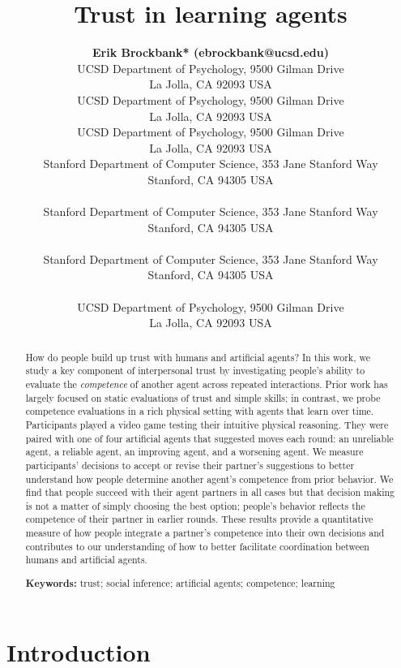 \documentclass[10pt,letterpaper]{article}
\title{Trust in learning agents}
\author{
  {
  \large \bf Erik Brockbank* (ebrockbank@ucsd.edu)} \\
  UCSD Department of Psychology, 9500 Gilman Drive \\
  La Jolla, CA 92093 USA
  \AND {\large \bf Haoliang Wang* (haw027@ucsd.edu)} \\
  UCSD Department of Psychology, 9500 Gilman Drive \\
  La Jolla, CA 92093 USA
  \AND {\large \bf Justin Yang (juy003@ucsd.edu)} \\
  UCSD Department of Psychology, 9500 Gilman Drive \\
  La Jolla, CA 92093 USA
  \AND {\large \bf Suvir Mirchandani (suvir@cs.stanford.edu)} \\
  Stanford Department of Computer Science, 353 Jane Stanford Way \\
  Stanford, CA 94305 USA \\
  \AND {\large \bf Erdem Biyik (ebiyik@stanford.edu)} \\
  Stanford Department of Computer Science, 353 Jane Stanford Way \\
  Stanford, CA 94305 USA \\
  \AND {\large \bf Dorsa Sadigh (dorsa@cs.stanford.edu)} \\
  Stanford Department of Computer Science, 353 Jane Stanford Way \\
  Stanford, CA 94305 USA \\
  \AND {\large \bf Judith Fan (jefan@ucsd.edu)} \\
  UCSD Department of Psychology, 9500 Gilman Drive \\
  La Jolla, CA 92093 USA \\
}
\begin{document}
\maketitle


\begin{abstract}
How do people build up trust with humans and artificial agents? In this work, we study a key component of interpersonal trust by investigating people's ability to evaluate the \textit{competence} of another agent across repeated interactions. Prior work has largely focused on static evaluations of trust and simple skills; in contrast, we probe competence evaluations in a rich physical setting with agents that learn over time. Participants played a video game testing their intuitive physical reasoning. They were paired with one of four artificial agents that suggested moves each round: an unreliable agent, a reliable agent, an improving agent, and a worsening agent. We measure participants' decisions to accept or revise their partner's suggestions to better understand how people determine another agent's competence from prior behavior. We find that people succeed with their agent partners in all cases but that decision making is not a matter of simply choosing the best option; people's behavior reflects the competence of their partner in earlier rounds. These results provide a quantitative measure of how people integrate a partner's competence into their own decisions and contributes to our understanding of how to better facilitate coordination between humans and artificial agents.

\textbf{Keywords:} 
trust; social inference; artificial agents; competence; learning 
\end{abstract}


\section{Introduction}
\end{document}
